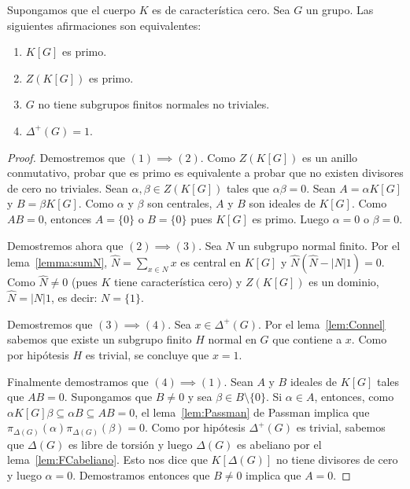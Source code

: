 \begin{theorem}[Connell]
	\label{thm:Connel}
	Supongamos que el cuerpo $K$ es de característica cero. 
	Sea $G$ un grupo. Las siguientes afirmaciones son equivalentes:
	\begin{enumerate}
		\item $K[G]$ es primo.
		\item $Z(K[G])$ es primo.
		\item $G$ no tiene subgrupos finitos normales no triviales.
		\item $\Delta^+(G)=1$.
	\end{enumerate}
\end{theorem}

\begin{proof}
	Demostremos que $(1)\implies(2)$. Como $Z(K[G])$ es un anillo conmutativo,
	probar que es primo es equivalente a probar que no existen divisores de
	cero no triviales. Sean $\alpha,\beta\in Z(K[G])$ tales que
	$\alpha\beta=0$. Sean $A=\alpha K[G]$ y $B=\beta K[G]$. Como $\alpha$ y
	$\beta$ son centrales, $A$ y $B$ son ideales de $K[G]$. Como $AB=0$,
	entonces $A=\{0\}$ o $B=\{0\}$ pues $K[G]$ es primo.  Luego $\alpha=0$ o
	$\beta=0$.

	Demostremos ahora que $(2)\implies(3)$. Sea $N$ un subgrupo normal finito.
	Por el lema~\ref{lemma:sumN}, $\widehat{N}=\sum_{x\in N}x$ es central en
	$K[G]$ y $\widehat{N}(\widehat{N}-|N|1)=0$. Como $\widehat{N}\ne 0$ (pues
	$K$ tiene característica cero) y $Z(K[G])$ es un dominio,
	$\widehat{N}=|N|1$, es decir: $N=\{1\}$.

	Demostremos que $(3)\implies(4)$. Sea $x\in\Delta^+(G)$. Por el
	lema~\ref{lem:Connel} sabemos que existe un subgrupo finito $H$ normal en
	$G$ que contiene a $x$. Como por hipótesis $H$ es trivial, se concluye que
	$x=1$.

	Finalmente demostramos que $(4)\implies(1)$. Sean $A$ y $B$ ideales de
	$K[G]$ tales que $AB=0$. Supongamos que $B\ne 0$ y sea $\beta\in
	B\setminus\{0\}$.  Si $\alpha\in A$, entonces, como $\alpha
	K[G]\beta\subseteq \alpha B\subseteq AB=0$, el lema~\ref{lem:Passman} de
	Passman implica que $\pi_{\Delta(G)}(\alpha)\pi_{\Delta(G)}(\beta)=0$.
	Como por hipótesis $\Delta^+(G)$ es trivial, sabemos que $\Delta(G)$ es 
	libre de torsión y luego $\Delta(G)$ es abeliano por el
	lema~\ref{lem:FCabeliano}. Esto nos dice que $K[\Delta(G)]$ no tiene
	divisores de cero y luego $\alpha=0$. Demostramos entonces que $B\ne0$
	implica que $A=0$.
\end{proof}

